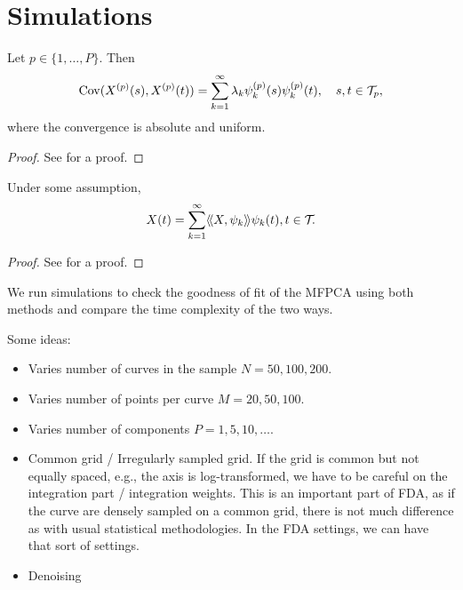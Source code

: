 \section{Simulations} %
\label{sec:simulations}

\begin{theorem}\label{th:mercer_th}
Let $p \in \{1, \dots, P\}$. Then
\begin{equation}
    \operatorname{Cov}(X^{(p)}(s), X^{(p)}(t)) = \sum_{k = 1}^\infty \lambda_k \psi_k^{(p)}(s)\psi_k^{(p)}(t), \quad s, t \in \mathcal{T}_{p},
\end{equation}
where the convergence is absolute and uniform.
\end{theorem}
\begin{proof}
    See \cite{happMultivariateFunctionalPrincipal2015} for a proof.
\end{proof}

\begin{theorem}\label{th:kl_th}
    Under some assumption,
\begin{equation}
    X(t) = \sum_{k = 1}^\infty \langle\!\langle X, \psi_k\rangle\!\rangle\psi_k(t), t \in \mathcal{T}_{}.
\end{equation}
\end{theorem}
\begin{proof}
    See \cite{happMultivariateFunctionalPrincipal2015} for a proof.
\end{proof}


We run simulations to check the goodness of fit of the MFPCA using both methods and compare the time complexity of the two ways. 

Some ideas:
\begin{itemize}
    \item Varies number of curves in the sample $N = 50, 100, 200$.
    \item Varies number of points per curve $M = 20, 50, 100$.
    \item Varies number of components $P = 1, 5, 10, \dots$.
    \item Common grid / Irregularly sampled grid. If the grid is common but not equally spaced, e.g., the axis is log-transformed, we have to be careful on the integration part / integration weights. This is an important part of FDA, as if the curve are densely sampled on a common grid, there is not much difference as with usual statistical methodologies. In the FDA settings, we can have that sort of settings. 
    \item Denoising
\end{itemize}

